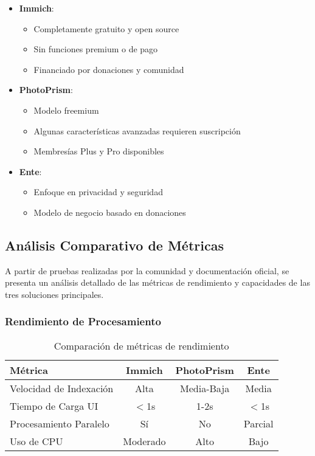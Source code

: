\begin{itemize}
    \item \textbf{Immich}:
    \begin{itemize}
        \item Completamente gratuito y open source
        \item Sin funciones premium o de pago
        \item Financiado por donaciones y comunidad
    \end{itemize}

    \item \textbf{PhotoPrism}:
    \begin{itemize}
        \item Modelo freemium
        \item Algunas características avanzadas requieren suscripción
        \item Membresías Plus y Pro disponibles
    \end{itemize}

    \item \textbf{Ente}:
    \begin{itemize}
        \item Enfoque en privacidad y seguridad
        \item Modelo de negocio basado en donaciones
    \end{itemize}
\end{itemize}

\subsection{Análisis Comparativo de Métricas}

A partir de pruebas realizadas por la comunidad y documentación oficial, se presenta un análisis detallado de las métricas de rendimiento y capacidades de las tres soluciones principales.

\subsubsection{Rendimiento de Procesamiento}

\begin{table}[H]
\centering
\begin{tabular}{|l|c|c|c|}
\hline
\textbf{Métrica} & \textbf{Immich} & \textbf{PhotoPrism} & \textbf{Ente} \\
\hline
Velocidad de Indexación & Alta & Media-Baja & Media \\
Tiempo de Carga UI & $<$1s & 1-2s & $<$1s \\
Procesamiento Paralelo & Sí & No & Parcial \\
Uso de CPU & Moderado & Alto & Bajo \\
\hline
\end{tabular}
\caption{Comparación de métricas de rendimiento}
\label{tab:performance_metrics}
\end{table}

